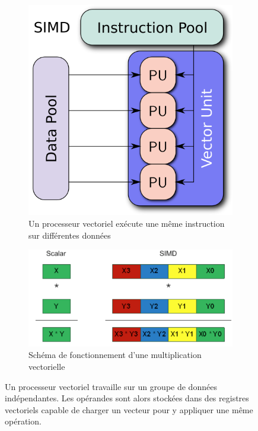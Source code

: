         \begin{figure}[ht!]
        \centering
        \begin{subfigure}[t]{0.48\textwidth}
            \centering
            \includegraphics[width=.45\linewidth]{images/cpu_simd.png}
            \caption{Un processeur vectoriel exécute une même instruction sur différentes données
                \label{pic_cpu_simd}}
        \end{subfigure}\hfill
        \begin{subfigure}[t]{0.48\textwidth}
            \centering
            \includegraphics[width=\linewidth]{images/Chapitre1/simd.png}
            \caption{Schéma de fonctionnement d'une multiplication vectorielle\protect\footnotemark}
                \label{pic_simd2}
        \end{subfigure}
        \caption{Un processeur vectoriel travaille sur un groupe de données indépendantes. Les opérandes sont alors stockées dans des registres vectoriels capable de charger un vecteur pour y appliquer une même opération.}
                    \label{pic_simd}
        \end{figure}


